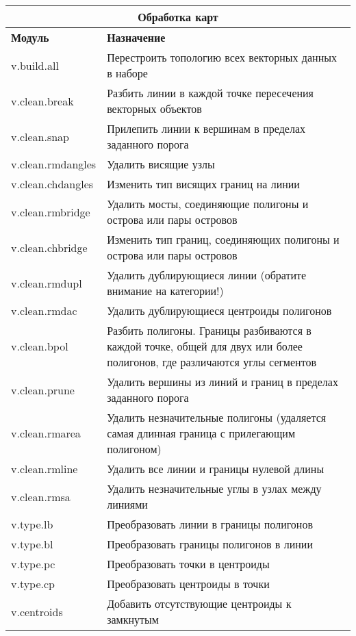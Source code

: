 {\renewcommand{\arraystretch}{0.7}
\begin{table}[H]
\centering
 \begin{tabular}{|p{3cm}|p{12cm}|}
  \hline \multicolumn{2}{|c|}{\textbf{Обработка карт}} \\
  \hline \textbf{Модуль} & \textbf{Назначение} \\
  \hline v.build.all & Перестроить топологию всех векторных данных в
  наборе \\
  \hline v.clean.break & Разбить линии в каждой точке пересечения
  векторных объектов \\
  \hline v.clean.snap & Прилепить линии к вершинам в пределах заданного
  порога \\
  \hline v.clean.rmdangles & Удалить висящие узлы \\
  \hline v.clean.chdangles & Изменить тип висящих границ на линии \\
  \hline v.clean.rmbridge & Удалить мосты, соединяющие полигоны и
  острова или пары островов \\
  \hline v.clean.chbridge & Изменить тип границ, соединяющих полигоны
  и острова или пары островов \\
  \hline v.clean.rmdupl & Удалить дублирующиеся линии (обратите внимание
  на категории!) \\
  \hline v.clean.rmdac & Удалить дублирующиеся центроиды полигонов \\
  \hline v.clean.bpol & Разбить полигоны. Границы разбиваются в каждой
  точке, общей для двух или более полигонов, где различаются углы сегментов \\
  \hline v.clean.prune & Удалить вершины из линий и границ в пределах
  заданного порога \\
  \hline v.clean.rmarea & Удалить незначительные полигоны (удаляется самая
  длинная граница с прилегающим полигоном) \\
  \hline v.clean.rmline & Удалить все линии и границы нулевой длины \\
  \hline v.clean.rmsa & Удалить незначительные углы в узлах между линиями \\
  \hline v.type.lb & Преобразовать линии в границы полигонов \\
  \hline v.type.bl & Преобразовать границы полигонов в линии \\
  \hline v.type.pc & Преобразовать точки в центроиды \\
  \hline v.type.cp & Преобразовать центроиды в точки \\
  \hline v.centroids & Добавить отсутствующие центроиды к замкнутым

\end{tabular}
\end{table}}

